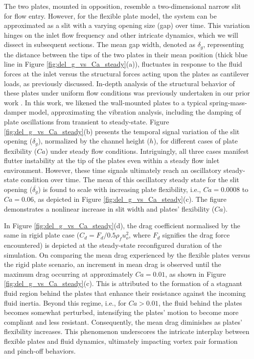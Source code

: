 \documentclass[final,3p,times,authoryear]{elsarticle}
\begin{document}
The two plates, mounted in opposition, resemble a two-dimensional narrow slit for flow entry. However, for the flexible plate model, the system can be approximated as a slit with a varying opening size (gap) over time. This variation hinges on the inlet flow frequency and other intricate dynamics, which we will dissect in subsequent sections. The mean gap width, denoted as $\delta_g$, representing the distance between the tips of the two plates in their mean position (thick blue line in Figure \ref{fig:del_g_vs_Ca_steady}(a)), fluctuates in response to the fluid forces at the inlet versus the structural forces acting upon the plates as cantilever loads, as previously discussed. In-depth analysis of the structural behavior of these plates under uniform flow conditions was previously undertaken in our prior work \citep{Self2019}. In this work, we likened the wall-mounted plates to a typical spring-mass-damper model, approximating the vibration analysis, including the damping of plate oscillations from transient to steady-state. Figure \ref{fig:del_g_vs_Ca_steady}(b) presents the temporal signal variation of the slit opening ($\delta_g$), normalized by the channel height ($h$), for different cases of plate flexibility ($Ca$) under steady flow conditions. Intriguingly, all three cases manifest flutter instability at the tip of the plates even within a steady flow inlet environment. However, these time signals ultimately reach an oscillatory steady-state condition over time. The mean of this oscillatory steady state for the slit opening ($\overline{\delta_g}$) is found to scale with increasing plate flexibility, i.e., $Ca=0.0008$ to $Ca=0.06$, as depicted in Figure \ref{fig:del_g_vs_Ca_steady}(c). The figure demonstrates a nonlinear increase in slit width and plates' flexibility ($Ca$).

In Figure \ref{fig:del_g_vs_Ca_steady}(d), the drag coefficient normalised by the same in rigid plate case ($C_d=F_d/0.5\rho_f u_o^2$, where $F_d$ signifies the drag force encountered) is depicted at the steady-state reconfigured duration of the simulation. On comparing the mean drag experienced by the flexible plates versus the rigid plate scenario, an increment in mean drag is observed until the maximum drag occurring at approximately $Ca=0.01$, as shown in Figure \ref{fig:del_g_vs_Ca_steady}(c). This is attributed to the formation of a stagnant fluid region behind the plates that enhance their resistance against the incoming fluid inertia. Beyond this regime, i.e., for $Ca>0.01$, the fluid behind the plates becomes somewhat perturbed, intensifying the plates' motion to become more compliant and less resistant. Consequently, the mean drag diminishes as plates' flexibility increases. This phenomenon underscores the intricate interplay between flexible plates and fluid dynamics, ultimately impacting vortex pair formation and pinch-off behaviors.
\end{document}
